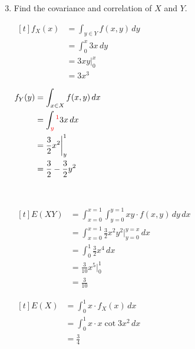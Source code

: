 \setcounter{exampleT}{1}
\begin{example}[Count.]
    \text{ }

    \begin{enumerate}[label=\alph*)]
        \setcounter{enumi}{2}
        \item Find  the covariance and correlation of $X$ and $Y$. 

        \begin{minipage}[t]{0.45\linewidth}
            $\begin{aligned}[t]
                f_X(x) & = \int_{y \in Y} f(x, y) \,dy \\
                       & = \int_0^x 3x \,dy            \\
                       & = 3xy \bigg|_0^x              \\
                       & = 3x^3
            \end{aligned}$
        \end{minipage}
        \begin{minipage}[t]{0.45\linewidth}
            $\begin{aligned}[t]
                f_Y(y) & = \int_{x \in X} f(x, y) \,dx                \\
                       & = \int_{\color{red}y}^{\color{red}1} 3x \,dx \\
                       & = \frac{3}{2} x^2 \bigg|_y^1                 \\
                       & = \frac{3}{2} - \frac{3}{2}y^2
            \end{aligned}$
        \end{minipage}

        {~~~}
        
        \begin{minipage}[t]{0.45\linewidth}
            $\begin{aligned}[t]
                E(XY) & = \int_{x=0}^{x=1} \int_{y=0}^{y=1} xy \cdot f(x, y) \,dy \,dx \\
                      & = \int_{x=0}^{x=1} \frac{3}{2} x^2 y^2 \bigg|_{y=0}^{y=x} \,dx \\
                      & = \int_0^1 \frac{3}{2} x^4 \,dx                                \\
                      & = \frac{3}{10} x^5 \bigg|_0^1                                  \\
                      & = \frac{3}{10}
            \end{aligned}$
        \end{minipage}
        \begin{minipage}[t]{0.45\linewidth}
            $\begin{aligned}[t]
                E(X) & = \int_0^1 x \cdot f_X(x) \,dx      \\
                     & = \int_0^1 x \cdot x \cot 3x^2 \,dx \\
                     & = \frac{3}{4}
            \end{aligned}$


\end{minipage}
\end{enumerate}
\end{example}
